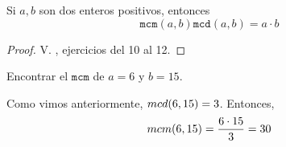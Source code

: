 	\begin{prop}
		\label{prop:mcm}
		Si $a,b$ son dos enteros positivos, entonces
		$$
		\texttt{mcm}(a,b)\texttt{mcd}(a,b)= a\cdot b
		$$
	\end{prop}
	\begin{proof}
		V. \cite[sección 7.5]{cardenas1973algebra}, ejercicios del 10 al 12. 
	\end{proof}
	\begin{problema}
		\label{exmp:mcm}
		Encontrar el $\texttt{mcm}$ de $a=6$ y $b=15.$
	\end{problema}
	\begin{sol}
		Como vimos anteriormente, $ mcd(6,15)=3 $. Entonces, 
		\[ mcm(6,15)=\dfrac{6\cdot15}{3}= 30 \]
	\end{sol}

